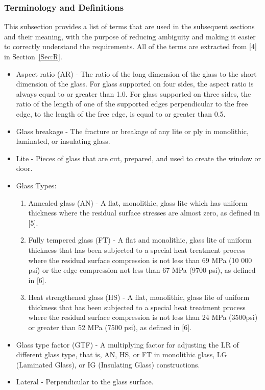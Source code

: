 \documentclass[12pt]{article}
\begin{document}
\subsubsection{Terminology and Definitions}
\label{Sec:TermandDefi}
This subsection provides a list of terms that are used in the subsequent sections and their meaning, with the purpose of reducing ambiguity and making it easier to correctly understand the requirements. All of the terms are extracted from [4] in Section~\ref{Sec:R}.
\begin{itemize}
\item{Aspect ratio (AR) - The ratio of the long dimension of the glass to the short dimension of the glass. For glass supported on four sides, the aspect ratio is always equal to or greater than 1.0. For glass supported on three sides, the ratio of the length of one of the supported edges perpendicular to the free edge, to the length of the free edge, is equal to or greater than 0.5.}
\item{Glass breakage - The fracture or breakage of any lite or ply in monolithic, laminated, or insulating glass.}
\item{Lite - Pieces of glass that are cut, prepared, and used to create the window or door.}
\item{Glass Types:}
\begin{enumerate}
\item{Annealed glass (AN) - A flat, monolithic, glass lite which has uniform thickness where the residual surface stresses are almost zero, as defined in [5].}
\item{Fully tempered glass (FT) - A flat and monolithic, glass lite of uniform thickness that has been subjected to a special heat treatment process where the residual surface compression is not less than 69 MPa (10 000 psi) or the edge compression not less than 67 MPa (9700 psi), as defined in [6].}
\item{Heat strengthened glass (HS) - A flat, monolithic, glass lite of uniform thickness that has been subjected to a special heat treatment process where the residual surface compression is not less than 24 MPa (3500psi) or greater than 52 MPa (7500 psi), as defined in [6].}
\end{enumerate}
\item{Glass type factor (GTF) - A multiplying factor for adjusting the LR of different glass type, that is, AN, HS, or FT in monolithic glass, LG (Laminated Glass), or IG (Insulating Glass) constructions.}
\item{Lateral - Perpendicular to the glass surface.}

\end{itemize}
\end{document}
